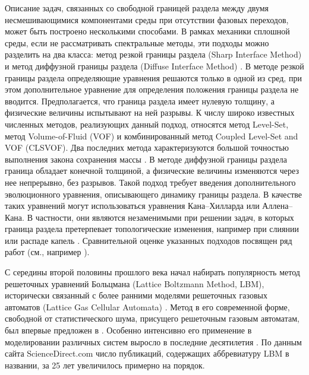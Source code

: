 \documentclass[12pt,a4paper]{article}
\begin{document}
Описание задач, связанных со свободной границей раздела между двумя несмешивающимися компонентами среды при отсутствии фазовых переходов, может быть построено несколькими способами. В рамках механики сплошной среды, если не рассматривать спектральные методы, эти подходы можно разделить на два класса: метод резкой границы раздела (Sharp Interface Method) и метод диффузной границы раздела (Diffuse Interface Method) \cite{Anderson1998, Udaykumar2001, Demont2023}.
В методе резкой границы раздела определяющие уравнения решаются только в одной из сред, при этом дополнительное уравнение для определения положения границы раздела не вводится. Предполагается, что граница раздела имеет нулевую толщину, а физические величины испытывают на ней разрывы. К числу широко известных численных методов, реализующих данный подход, относятся метод Level-Set, метод Volume-of-Fluid (VOF) и комбинированный метод Coupled Level-Set and VOF (CLSVOF). Два последних метода характеризуются большой точностью выполнения закона сохранения массы \cite{Hirt1981, Sethian2003, Wang2009, Ningegowda2014}.
В методе диффузной границы раздела граница обладает конечной толщиной, а физические величины изменяются через нее непрерывно, без разрывов. Такой подход требует введения дополнительного эволюционного уравнения, описывающего динамику границы раздела. В качестве таких уравнений могут использоваться уравнения Кана–Хилларда или Аллена–Кана. В частности, они являются незаменимыми при решении задач, в которых граница раздела претерпевает топологические изменения, например при слиянии или распаде капель \cite{Cahn1958, Cahn1959, Allen1976, Anderson1998, Lamorgese2011}.
Сравнительной оценке указанных подходов посвящен ряд работ (см., например \cite{Shaikh2018, Liu2019, Zhang2025}).

С середины второй половины прошлого века начал набирать популярность метод решеточных уравнений Больцмана (Lattice Boltzmann Method, LBM), исторически связанный с более ранними моделями решеточных газовых автоматов (Lattice Gas Cellular Automata) \cite{WolfGladrow2005}. Метод в его современной форме, свободной от статистического шума, присущего решеточным газовым автоматам, был впервые предложен в \cite{McNamaraZanetti1988}. %
Особенно интенсивно его применение в моделировании различных систем выросло в последние десятилетия \cite{Li2020, ChenDoolen1998}. По данным сайта ScienceDirect.com число публикаций, содержащих аббревиатуру LBM в названии, за 25 лет увеличилось примерно на порядок.
\end{document}
